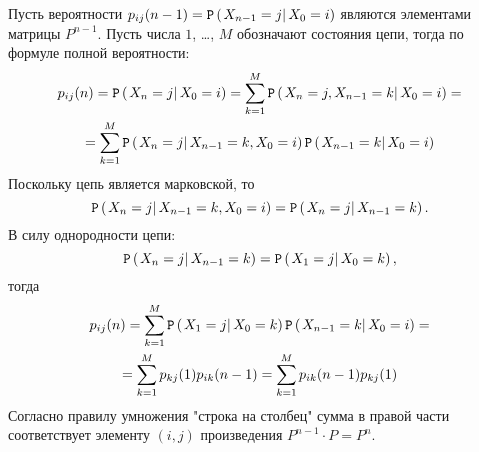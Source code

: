 \documentclass[12pt]{article}
\begin{document}
    Пусть вероятности $p_{ij}(n-1) = \mathtt{P} \left ( \left . {X_{n-1} = j} \right | {X_0 = i} \right )$ являются элементами матрицы $P^{n-1}$. Пусть числа $1$, \dots, $M$ обозначают состояния цепи, тогда
    по формуле полной вероятности:
    \begin{multline*}
        p_{ij}(n)
        = \mathtt{P} \left ( \left . {X_n = j} \right | {X_0 = i} \right )
        = \sum_{k=1}^M \mathtt{P} \left ( \left . {X_n = j, X_{n-1} = k} \right | {X_0 = i} \right ) = \\
        = \sum_{k=1}^M \mathtt{P} \left ( \left . {X_n = j} \right | {X_{n-1} = k, X_0 = i} \right ) \mathtt{P} \left ( \left . {X_{n-1} = k} \right | {X_0 = i} \right )
    \end{multline*}
    Поскольку цепь является марковской, то
    \[
        \mathtt{P} \left ( \left . {X_n = j} \right | {X_{n-1} = k, X_0 = i} \right )
        = \mathtt{P} \left ( \left . {X_n = j} \right | {X_{n-1} = k} \right ) .
    \]
    В силу однородности цепи:
    \[
        \mathtt{P} \left ( \left . {X_n = j} \right | {X_{n-1} = k} \right )
        = \mathtt{P} \left ( \left . {X_1 = j} \right | {X_0 = k} \right ),
    \]
    тогда
    \begin{multline*}
        p_{ij}(n)
        = \sum_{k=1}^M \mathtt{P} \left ( \left . {X_1 = j} \right | {X_0 = k} \right ) \mathtt{P} \left ( \left . {X_{n-1} = k} \right | {X_0 = i} \right ) = \\
        = \sum_{k=1}^M p_{kj}(1) p_{ik}(n-1)
        = \sum_{k=1}^M p_{ik}(n-1) p_{kj}(1)
    \end{multline*}
    Согласно правилу умножения "строка на столбец"{} сумма в правой части соответствует элементу $(i,j)$ произведения $P^{n-1} \cdot P = P^n$.
\end{document}
